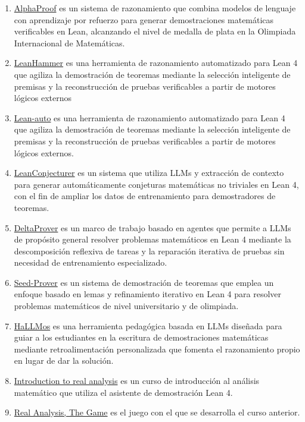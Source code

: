 \documentclass[12pt,a4paper]{article}
\begin{document}
\begin{enumerate}
\item \href{https://deepmind.google/blog/ai-solves-imo-problems-at-silver-medal-level/}{AlphaProof} es un sistema de razonamiento que combina modelos de lenguaje con aprendizaje por refuerzo para generar demostraciones matemáticas verificables en Lean, alcanzando el nivel de medalla de plata en la Olimpiada Internacional de Matemáticas.
\item \href{https://cmu-l3.github.io/lean-hammer/}{LeanHammer} es una herramienta de razonamiento automatizado para Lean 4 que agiliza la demostración de teoremas mediante la selección inteligente de premisas y la reconstrucción de pruebas verificables a partir de motores lógicos externos
\item \href{https://arxiv.org/abs/2505.14929v2}{Lean-auto} es una herramienta de razonamiento automatizado para Lean 4 que agiliza la demostración de teoremas mediante la selección inteligente de premisas y la reconstrucción de pruebas verificables a partir de motores lógicos externos.
\item \href{https://arxiv.org/abs/2506.22005v1}{LeanConjecturer} es un sistema que utiliza LLMs y extracción de contexto para generar automáticamente conjeturas matemáticas no triviales en Lean 4, con el fin de ampliar los datos de entrenamiento para demostradores de teoremas.
\item \href{https://github.com/ByteDance-Seed/Seed-Prover/tree/main/DeltaProver}{DeltaProver} es un marco de trabajo basado en agentes que permite a LLMs de propósito general resolver problemas matemáticos en Lean 4 mediante la descomposición reflexiva de tareas y la reparación iterativa de pruebas sin necesidad de entrenamiento especializado.
\item \href{https://arxiv.org/abs/2507.23726v1}{Seed-Prover} es un sistema de demostración de teoremas que emplea un enfoque basado en lemas y refinamiento iterativo en Lean 4 para resolver problemas matemáticos de nivel universitario y de olimpiada.
\item \href{https://hallmos.com/}{HaLLMos} es una herramienta pedagógica basada en LLMs diseñada para guiar a los estudiantes en la escritura de demostraciones matemáticas mediante retroalimentación personalizada que fomenta el razonamiento propio en lugar de dar la solución.
\item \href{https://alexkontorovich.github.io/2025F311H/}{Introduction to real analysis} es un curso de introducción al análisis matemático que utiliza el asistente de demostración Lean 4.
\item \href{https://adam.math.hhu.de/\#/g/AlexKontorovich/RealAnalysisGame}{Real Analysis, The Game} es el juego con el que se desarrolla el curso anterior.

\end{enumerate}
\end{document}
